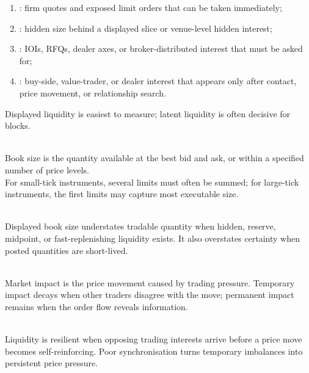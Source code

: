 \documentclass[a4paper,oneside,openany]{book}
\begin{document}
\begin{taxonomy} 
\begin{enumerate}[label=\roman*.]
\setlength{\itemsep}{0pt}
\item {}: firm quotes and exposed limit orders that can be taken immediately;
\item {}: hidden size behind a displayed slice or venue-level hidden interest;
\item {}: IOIs, RFQs, dealer axes, or broker-distributed interest that must be asked for;
\item {}: buy-side, value-trader, or dealer interest that appears only after contact, price movement, or relationship search.
\end{enumerate}
Displayed liquidity is easiest to measure; latent liquidity is often decisive for blocks.
\end{taxonomy}

\begin{definition} \\
Book size is the quantity available at the best bid and ask, or within a specified number of price levels.\\
For small-tick instruments, several limits must often be summed; for large-tick instruments, the first limits may capture most executable size.
\end{definition}

\begin{caveat} \\
Displayed book size understates tradable quantity when hidden, reserve, midpoint, or fast-replenishing liquidity exists. It also overstates certainty when posted quantities are short-lived.
\end{caveat}

\begin{mechanism} \\
Market impact is the price movement caused by trading pressure. Temporary impact decays when other traders disagree with the move; permanent impact remains when the order flow reveals information.
\end{mechanism}

\begin{principle} \\
Liquidity is resilient when opposing trading interests arrive before a price move becomes self-reinforcing. Poor synchronisation turns temporary imbalances into persistent price pressure.
\end{principle}
\end{document}
